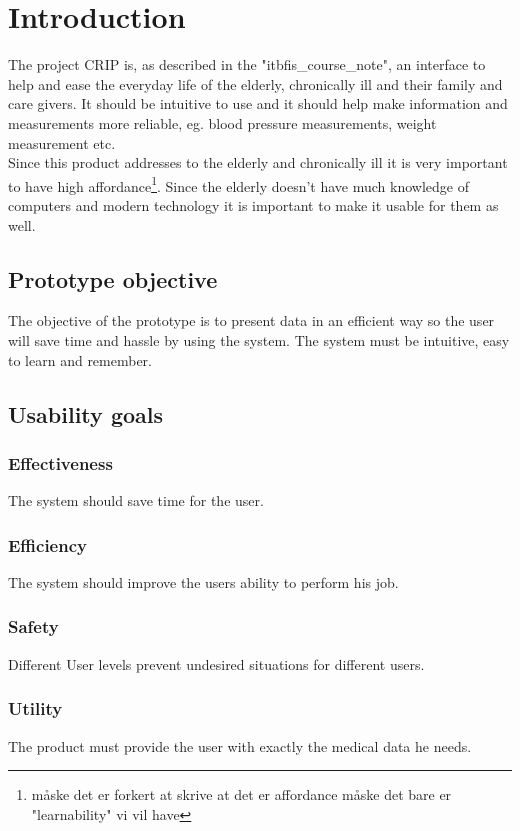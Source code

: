 \chapter{Introduction}
The project CRIP is, as described in the "itbfis\_course\_note", an interface to help and ease the everyday life of the elderly, chronically ill and their family and care givers. It should be intuitive to use and it should help make information and measurements more reliable, eg. blood pressure measurements, weight measurement  etc. \\
Since this product addresses to the elderly and chronically ill it is very important to have high affordance\footnote{måske det er forkert at skrive at det er affordance måske det bare er "learnability" vi vil have}. Since the elderly doesn't have much knowledge of computers and modern technology it is important to make it usable for them as well.\\

\section{Prototype objective}
The objective of the prototype is to present data in an efficient way so the user will save time and hassle by using the system. The system must be intuitive, easy to learn and remember. 

\section{Usability goals}
\subsection{Effectiveness}
The system should save time for the user.

\subsection{Efficiency}
The system should improve the users ability to perform his job.

\subsection{Safety}
Different User levels prevent undesired situations for different users. 

\subsection{Utility}
The product must provide the user with exactly the medical data he needs.


